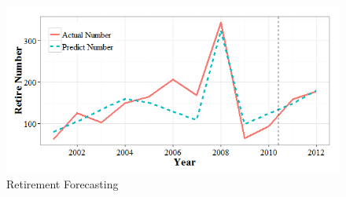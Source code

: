 \documentclass[12pt,letterpaper]{article}
\begin{document}
\begin{figure}[h!]
	\centering
	\includegraphics[width=5in]{retire2.png}
	\caption{Retirement Forecasting}
	\label{fig:predict}	
	
\end{figure}
\end{document}
